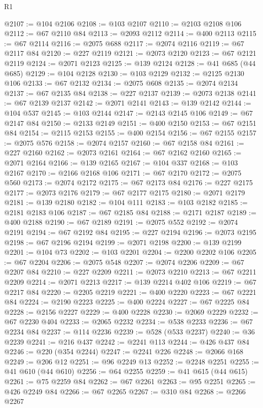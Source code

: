 \begin{lexlean}{R1}
\begin{coremodule}
@2107 := @104 @2106
@2108 := @103 @2107
@2110 := @2103 @2108 @106
@2112 := @67 @2110 @84
@2113 := @2093 @2112
@2114 := @400 @2113
@2115 := @67 @2114
@2116 := @2075 @688
@2117 := @2074 @2116
@2119 := @67 @2117 @84
@2120 := @227 @2119
@2121 := @2073 @2120
@2123 := @67 @2121 @2119
@2124 := @2071 @2123
@2125 := @139 @2124
@2128 := @41 @685 (@44 @685)
@2129 := @104 @2128
@2130 := @103 @2129
@2132 := @2125 @2130 @106
@2133 := @67 @2132
@2134 := @2075 @608
@2135 := @2074 @2134
@2137 := @67 @2135 @84
@2138 := @227 @2137
@2139 := @2073 @2138
@2141 := @67 @2139 @2137
@2142 := @2071 @2141
@2143 := @139 @2142
@2144 := @104 @537
@2145 := @103 @2144
@2147 := @2143 @2145 @106
@2149 := @67 @2147 @84
@2150 := @2133 @2149
@2151 := @400 @2150
@2153 := @67 @2151 @84
@2154 := @2115 @2153
@2155 := @400 @2154
@2156 := @67 @2155
@2157 := @2075 @576
@2158 := @2074 @2157
@2160 := @67 @2158 @84
@2161 := @227 @2160
@2162 := @2073 @2161
@2164 := @67 @2162 @2160
@2165 := @2071 @2164
@2166 := @139 @2165
@2167 := @104 @337
@2168 := @103 @2167
@2170 := @2166 @2168 @106
@2171 := @67 @2170
@2172 := @2075 @560
@2173 := @2074 @2172
@2175 := @67 @2173 @84
@2176 := @227 @2175
@2177 := @2073 @2176
@2179 := @67 @2177 @2175
@2180 := @2071 @2179
@2181 := @139 @2180
@2182 := @104 @111
@2183 := @103 @2182
@2185 := @2181 @2183 @106
@2187 := @67 @2185 @84
@2188 := @2171 @2187
@2189 := @400 @2188
@2190 := @67 @2189
@2191 := @2075 @552
@2192 := @2074 @2191
@2194 := @67 @2192 @84
@2195 := @227 @2194
@2196 := @2073 @2195
@2198 := @67 @2196 @2194
@2199 := @2071 @2198
@2200 := @139 @2199
@2201 := @104 @73
@2202 := @103 @2201
@2204 := @2200 @2202 @106
@2205 := @67 @2204
@2206 := @2075 @548
@2207 := @2074 @2206
@2209 := @67 @2207 @84
@2210 := @227 @2209
@2211 := @2073 @2210
@2213 := @67 @2211 @2209
@2214 := @2071 @2213
@2217 := @139 @2214 @402 @106
@2219 := @67 @2217 @84
@2220 := @2205 @2219
@2221 := @400 @2220
@2223 := @67 @2221 @84
@2224 := @2190 @2223
@2225 := @400 @2224
@2227 := @67 @2225 @84
@2228 := @2156 @2227
@2229 := @400 @2228
@2230 := @2069 @2229
@2232 := @67 @2230 @404
@2233 := @2065 @2232
@2234 := @538 @2233
@2236 := @67 @2234 @84
@2237 := @114 @2236
@2239 := @528 (@533 @2237)
@2240 := @36 @2239
@2241 := @216 @437
@2242 := @2241 @113
@2244 := @426 @437 @84
@2246 := @220 (@354 @2244)
@2247 := @2241 @226
@2248 := @2066 @168
@2249 := @206 @12
@2251 := @96 @2249 @13
@2252 := @2248 @2251
@2255 := @41 @610 (@44 @610)
@2256 := @64 @2255
@2259 := @41 @615 (@44 @615)
@2261 := @75 @2259 @84
@2262 := @67 @2261
@2263 := @95 @2251
@2265 := @426 @2249 @84
@2266 := @67 @2265
@2267 := @310 @84
@2268 := @2266 @2267

\end{coremodule}
\end{lexlean}
